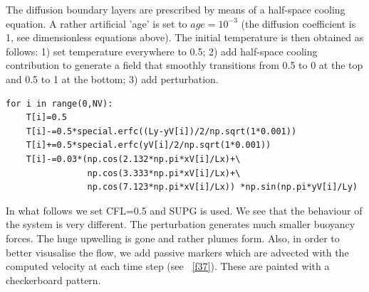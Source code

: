 The diffusion boundary layers are prescribed by means of a half-space cooling equation.
A rather artificial 'age' is set to $age=10^{-3}$ (the diffusion coefficient is 1, 
see dimensionless equations above).
The initial temperature is then obtained as follows: 1) set temperature everywhere to 0.5; 
2) add half-space cooling contribution to generate a field that smoothly transitions 
from 0.5 to 0 at the top and 0.5 to 1 at the bottom; 3) add perturbation. 

\begin{lstlisting}
for i in range(0,NV):
    T[i]=0.5
    T[i]-=0.5*special.erfc((Ly-yV[i])/2/np.sqrt(1*0.001))
    T[i]+=0.5*special.erfc(yV[i]/2/np.sqrt(1*0.001))
    T[i]-=0.03*(np.cos(2.132*np.pi*xV[i]/Lx)+\
                np.cos(3.333*np.pi*xV[i]/Lx)+\
                np.cos(7.123*np.pi*xV[i]/Lx)) *np.sin(np.pi*yV[i]/Ly)
\end{lstlisting}

In what follows we set CFL=0.5 and SUPG is used.
We see that the behaviour of the system is very different. The perturbation generates 
much smaller buoyancy forces. The huge upwelling is gone and rather plumes form. 
Also, in order to better visusalise the flow, we add passive markers which are 
advected with the computed velocity at each time step (see \stone~\ref{f37}).
These are painted with a checkerboard pattern.

\newpage

